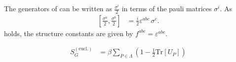 The generators of \SUTwo can be written as $\frac{\sigma^i}{2}$ in terms of the pauli matrices $\sigma^i$. As
\begin{align*}
 \left[ \frac{\sigma^a}{2}, \frac{\sigma^b}{2} \right] & = \frac{i}{2} \varepsilon^{abc} \, \sigma^c \textrm{.}
\end{align*}
holds, the structure constants are given by $f^{abc} = \varepsilon^{abc}$.



\begin{align*}
 S_G^{(\textrm{eucl.})} & = \beta \sum_{P \in \Lambda} \left(1-\frac{1}{2} \textrm{Tr} \left[ U_P \right] \right)
\end{align*}
